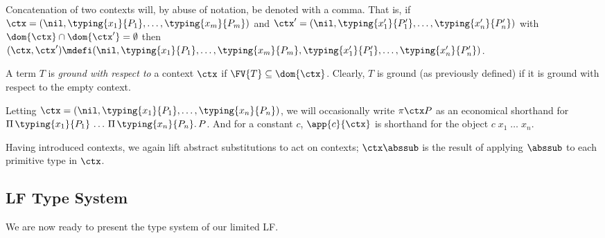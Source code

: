 Concatenation of two contexts will, by abuse of notation, be denoted with a comma.
That is, if $\ctx = (\nil, \typing{x_1}{P_1}, \ldots, \typing{x_m}{P_m})$ and $\ctx' = (\nil, \typing{x_1'}{P_1'}, \ldots, \typing{x_n'}{P_n'})$ with $\dom{\ctx} \cap \dom{\ctx'} = \emptyset$ then $(\ctx, \ctx') \mdefi (\nil, \typing{x_1}{P_1}, \ldots, \typing{x_m}{P_m}, \typing{x_1'}{P_1'}, \ldots, \typing{x_n'}{P_n'})$.

A term $T$ is \emph{ground with respect to} a context $\ctx$ if $\FV{T} \subseteq \dom{\ctx}$.
Clearly, $T$ is ground (as previously defined) if it is ground with respect to the empty context.

Letting $\ctx = (\nil, \typing{x_1}{P_1}, \ldots, \typing{x_n}{P_n})$, we will occasionally write $\pi{\ctx}{P}$ as an economical shorthand for $\Pi \, \typing{x_1}{P_1} \, \ldots \, \Pi \, \typing{x_n}{P_n} . \, P$.
And for a constant $c$, $\app{c}{\ctx}$ is shorthand for the object $c \; x_1 \; \ldots \; x_n$.

Having introduced contexts, we again lift abstract substitutions to act on contexts; $\ctx \abssub$ is the result of applying $\abssub$ to each primitive type in $\ctx$.

\subsection*{LF Type System}

We are now ready to present the type system of our limited LF.

%
%

